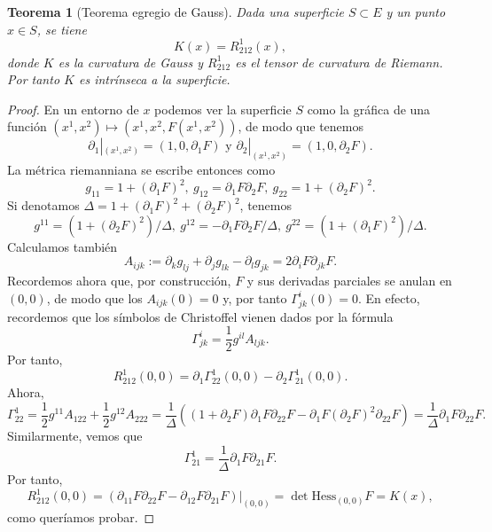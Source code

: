 \documentclass[11pt,a4paper]{amsbook}
\newtheorem{thm}[subsection]{Teorema}
\theoremstyle{remark} \newtheorem{rmk}[subsection]{Observación}
\theoremstyle{definition} \newtheorem{defn}[subsection]{Definición}
\theoremstyle{definition} \newtheorem{ex}[subsection]{Ejemplo}
\theoremstyle{definition} \newtheorem{ej}[subsection]{Ejercicio}
\begin{document}
\begin{thm}[Teorema egregio de Gauss]
  Dada una superficie $S\subset E$ y un punto $x\in S$, se tiene
  \begin{equation*}
K(x) = R^1_{212}(x),
  \end{equation*}
donde $K$ es la curvatura de Gauss y $R^1_{212}$ es el tensor de curvatura de Riemann. Por tanto $K$ es intrínseca a la superficie.
\end{thm}

\begin{proof}
  En un entorno de $x$ podemos ver la superficie $S$ como la gráfica de una función $(x^1,x^2)\mapsto (x^1,x^2,F(x^1,x^2))$, de modo que tenemos
  \begin{equation*}
\partial_1|_{(x^1,x^2)} = (1,0,\partial_1 F) \text{ y } \partial_2|_{(x^1,x^2)} = (1,0,\partial_2 F).
  \end{equation*}
  La métrica riemanniana se escribe entonces como
  \begin{equation*}
g_{11} = 1 + (\partial_1F)^2, \ g_{12}= \partial_1 F \partial_2 F, \ g_{22}=1 + (\partial_2F)^2.
  \end{equation*}
  Si denotamos $\Delta = 1 + (\partial_1F)^2 + (\partial_2F)^2$, tenemos
  \begin{equation*}
g^{11} = (1 + (\partial_2F)^2)/\Delta, \ g^{12}= -\partial_1 F \partial_2 F/\Delta, \ g^{22}=(1 + (\partial_1F)^2)/\Delta.
  \end{equation*}
 Calculamos también
  \begin{equation*}
A_{ijk} := \partial_k g_{lj} + \partial_j g_{lk} -\partial_l g_{jk} = 2 \partial_i F \partial_{jk} F.
  \end{equation*}
  Recordemos ahora que, por construcción, $F$ y sus derivadas parciales se anulan en $(0,0)$, de modo que los $A_{ijk}(0)=0$ y, por tanto $\Gamma^i_{jk}(0) = 0$. En efecto, recordemos que los símbolos de Christoffel vienen dados por la fórmula
  \begin{equation*}
\Gamma^i_{jk} = \frac{1}{2} g^{il} A_{ljk}.
  \end{equation*}
  Por tanto,
  \begin{equation*}
R^1_{212}(0,0) = \partial_1 \Gamma^1_{22}(0,0) - \partial_2\Gamma^1_{21}(0,0).
  \end{equation*}
  Ahora,
  \begin{equation*}
\Gamma^1_{22} = \frac{1}{2} g^{11} A_{122} + \frac{1}{2} g^{12} A_{222} = \frac{1}{\Delta}((1+\partial_2 F) \partial_1F \partial_{22} F - \partial_1 F (\partial_2 F)^2 \partial_{22}F) = \frac{1}{\Delta} \partial_1F \partial_{22}F.
  \end{equation*}
  Similarmente, vemos que
  \begin{equation*}
\Gamma^1_{21} = \frac{1}{\Delta} \partial_1 F \partial_{21} F.
  \end{equation*}
  Por tanto,
  \begin{equation*}
R^1_{212}(0,0) = (\partial_{11}F \partial_{22}F - \partial_{12}F\partial_{21}F)|_{(0,0)} = \det \mathrm{Hess}_{(0,0)} F = K(x),
  \end{equation*}
como queríamos probar.
\end{proof}
\end{document}
